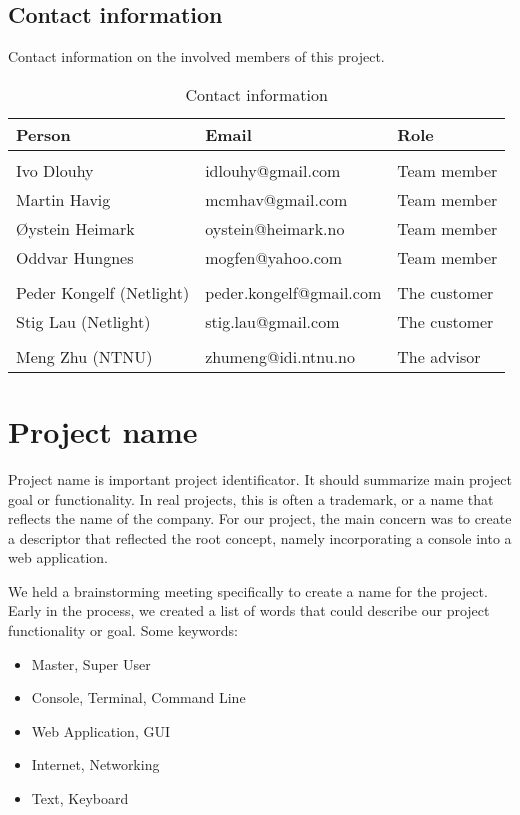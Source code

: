 \subsection{Contact information}
Contact information on the involved members of this project.
\begin{table}
\centering
\caption{Contact information}
\begin{tabular}{ l  l  l  }
 \textbf{Person} & \textbf{Email} & \textbf{Role} \\ 
\hline \\[-2.0ex]
 Ivo Dlouhy & idlouhy@gmail.com & Team member \\
 Martin Havig & mcmhav@gmail.com & Team member \\
 Øystein Heimark & oystein@heimark.no & Team member \\
 Oddvar Hungnes & mogfen@yahoo.com & Team member \\ 
\hline \\[-2.0ex]
 Peder Kongelf (Netlight) & peder.kongelf@gmail.com & The customer \\
 Stig Lau (Netlight) & stig.lau@gmail.com & The customer \\ 
\hline \\[-2.0ex]
  Meng Zhu (NTNU) & zhumeng@idi.ntnu.no & The advisor \\ 
\hline
\end{tabular}
\end{table}

\section{Project name}
Project name is important project identificator. It should summarize main project goal or functionality. In real projects, this is often a trademark, or a name that reflects the name of the company. For our project, the main concern was to create a descriptor that reflected the root concept, namely incorporating a console into a web application.

We held a brainstorming meeting specifically to create a name for the project. Early in the process, we created a list of words that could describe our project functionality or goal. Some keywords:
\begin{itemize}
\item Master, Super User
\item Console, Terminal, Command Line
\item Web Application, GUI
\item Internet, Networking
\item Text, Keyboard
\end{itemize}

